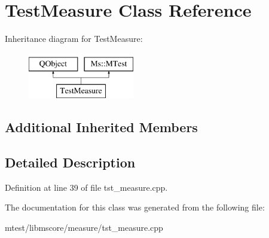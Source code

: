 \hypertarget{class_test_measure}{}\section{Test\+Measure Class Reference}
\label{class_test_measure}
Inheritance diagram for Test\+Measure\+:\begin{figure}[H]
\begin{center}
\leavevmode
\includegraphics[height=2.000000cm]{class_test_measure}
\end{center}
\end{figure}
\subsection*{Additional Inherited Members}


\subsection{Detailed Description}


Definition at line 39 of file tst\+\_\+measure.\+cpp.



The documentation for this class was generated from the following file\+:\begin{DoxyCompactItemize}
\item 
mtest/libmscore/measure/tst\+\_\+measure.\+cpp\end{DoxyCompactItemize}
